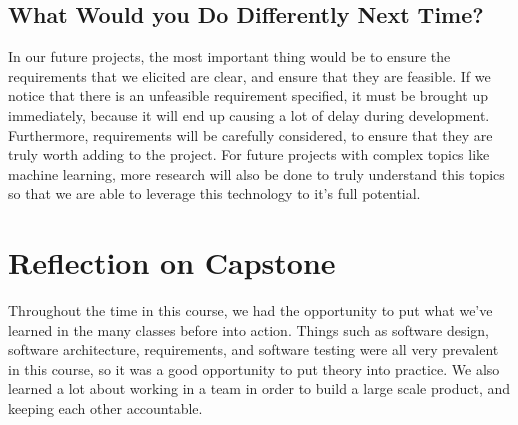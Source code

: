 \documentclass{article}
\begin{document}
\subsection{What Would you Do Differently Next Time?}

In our future projects, the most important thing would be to ensure the
requirements that we elicited are clear, and ensure that they are feasible. If
we notice that there is an unfeasible requirement specified, it must be brought
up immediately, because it will end up causing a lot of delay during
development. Furthermore, requirements will be carefully considered, to ensure
that they are truly worth adding to the project. For future projects with
complex topics like machine learning, more research will also be done to truly
understand this topics so that we are able to leverage this technology to it's
full potential.

\section{Reflection on Capstone}

Throughout the time in this course, we had the opportunity to put what we've
learned in the many classes before into action. Things such as software design,
software architecture, requirements, and software testing were all very
prevalent in this course, so it was a good opportunity to put theory into
practice. We also learned a lot about working in a team in order to build a
large scale product, and keeping each other accountable.
\end{document}
